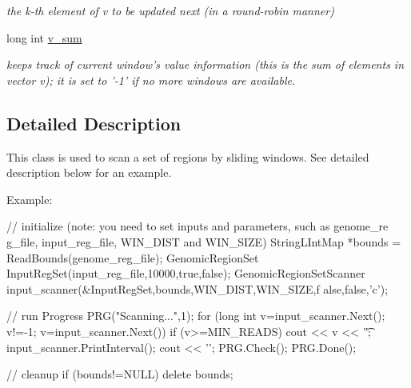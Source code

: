 \begin{DoxyCompactItemize}
\begin{DoxyCompactList}\small\item\em the k-\/th element of v to be updated next (in a round-\/robin manner) \end{DoxyCompactList}\item 
\hypertarget{classGenomicRegionSetScanner_a80be27fad3a3456e7aecd71fb7439c5a}{
long int \hyperlink{classGenomicRegionSetScanner_a80be27fad3a3456e7aecd71fb7439c5a}{v\_\-sum}}
\label{classGenomicRegionSetScanner_a80be27fad3a3456e7aecd71fb7439c5a}

\begin{DoxyCompactList}\small\item\em keeps track of current window's value information (this is the sum of elements in vector v); it is set to '-\/1' if no more windows are available. \end{DoxyCompactList}\end{DoxyCompactItemize}


\subsection{Detailed Description}
This class is used to scan a set of regions by sliding windows. See detailed description below for an example. 

Example: 
\begin{DoxyCode}
    // initialize (note: you need to set inputs and parameters, such as genome_re
      g_file, input_reg_file, WIN_DIST and WIN_SIZE)
    StringLIntMap *bounds = ReadBounds(genome_reg_file);
    GenomicRegionSet InputRegSet(input_reg_file,10000,true,false);
    GenomicRegionSetScanner input_scanner(&InputRegSet,bounds,WIN_DIST,WIN_SIZE,f
      alse,false,'c');

    // run
    Progress PRG("Scanning...",1);
    for (long int v=input_scanner.Next(); v!=-1; v=input_scanner.Next()) {
      if (v>=MIN_READS) {
        cout << v << '\t';
        input_scanner.PrintInterval();
        cout << '\n';
      }
      PRG.Check();
    }
    PRG.Done();
  
    // cleanup
    if (bounds!=NULL) delete bounds;
\end{DoxyCode}
 


